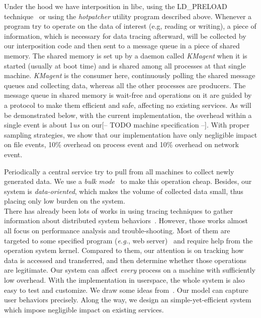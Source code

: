 \documentclass[letterpaper,twocolumn,10pt]{article}
\begin{document}
Under the hood we have interposition in libc, using the LD\_PRELOAD
technique~\cite{LDPRELOADKrentel:2013, LDPRELOADLee:2011, LDPRELOADSaito:2005}
or using the \textit{hotpatcher} utility program
described above. Whenever a program try to operate on the data of interest
(e.g, reading or writing), a piece of information, which is necessary for
data tracing afterward, will be collected by our interposition code and then
sent to a message queue in a piece of shared memory. The shared memory is set
up by a daemon called \textit{KMagent} when it is started (usually at boot
time) and is shared among all processes at that single machine.
\textit{KMagent} is the consumer here, continuously polling the shared
message queues and collecting data, whereas all the other processes are
producers. The message queue in shared memory is wait-free and operations on
it are guided by a protocol to make them efficient and safe, affecting no
existing services. As will be demonstrated below, with the current
implementation, the overhead within a single event is about 1\textit{us} on 
our[-- TODO machine specification --]. With proper sampling strategies, we
show that our implementation have only negligible impact on file events, 10\%
overhead on process event and 10\% overhead on network event. 

Periodically a central service try to pull from all machines to collect newly
generated data. We use a \textit{bulk mode}~\cite{CACMDean:2013} to make this
operation cheap. Besides, our system is \textit{data-oriented}, which makes
the volume of collected data small, thus placing only low burden on the
system.\\

There has already been lots of works in using tracing techniques to gather
information about distributed system behaviors~\cite{magpie:2004, magpie:2003,
pinpoint:2002, xtrace:2007, dapper:2010}.  However, those works almost all
focus on performance analysis and trouble-shooting. Most of them are targeted
to some specified program (\textit{e.g.}, web server)~\cite{magpie:2004,
magpie:2003} and require help from the operation system kernel. Compared to
them, our attention is on tracking how data is accessed and transferred, and
then determine whether those operations are legitimate. Our system can affect
\textit{every} process on a machine with sufficiently low overhead. With the
implementation in userspace, the whole system is also easy to test and
customize. We draw some ideas from~\cite{BackTraceKing:2003,
BackTraceKing:2005}. Our model can capture user behaviors precisely. Along the
way, we design an simple-yet-efficient system which impose negligible impact
on existing services.\\
\end{document}
